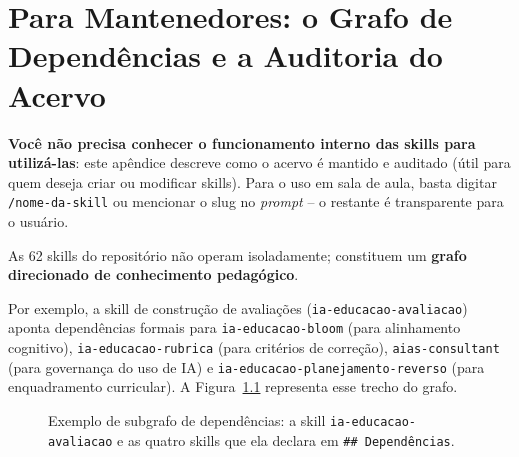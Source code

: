\chapter{Para Mantenedores: o Grafo de Depend{\^e}ncias e a Auditoria do Acervo}
\label{ap:mantenedor}

\begin{dicaopencode}
\textbf{Voc{\^e} n{\~a}o precisa conhecer o funcionamento interno das skills para utiliz{\'a}-las}: este ap{\^e}ndice descreve como o acervo {\'e} mantido e auditado ({\'u}til para quem deseja criar ou modificar skills). Para o uso em sala de aula, basta digitar \texttt{/nome-da-skill} ou mencionar o slug no \emph{prompt} -- o restante {\'e} transparente para o usu{\'a}rio.
\end{dicaopencode}

As 62 skills do reposit{\'o}rio n{\~a}o operam isoladamente; constituem um \textbf{grafo direcionado de conhecimento pedag{\'o}gico}.

Por exemplo, a skill de constru{\c c}{\~a}o de avalia{\c c}{\~o}es (\texttt{ia-educacao-avaliacao}) aponta depend{\^e}ncias formais para \texttt{ia-educacao-bloom} (para alinhamento cognitivo), \texttt{ia-educacao-rubrica} (para crit{\'e}rios de corre{\c c}{\~a}o), \texttt{aias-consultant} (para governan{\c c}a do uso de IA) e \texttt{ia-educacao-planejamento-reverso} (para enquadramento curricular). A Figura~\ref{fig:subgrafo-exemplo} representa esse trecho do grafo.

\begin{figure}[htbp]
  \centering
  \caption{Exemplo de subgrafo de depend{\^e}ncias: a skill \texttt{ia-educacao-avaliacao} e as quatro skills que ela declara em \texttt{\#\# Depend{\^e}ncias}.}
  \label{fig:subgrafo-exemplo}
\end{figure}

